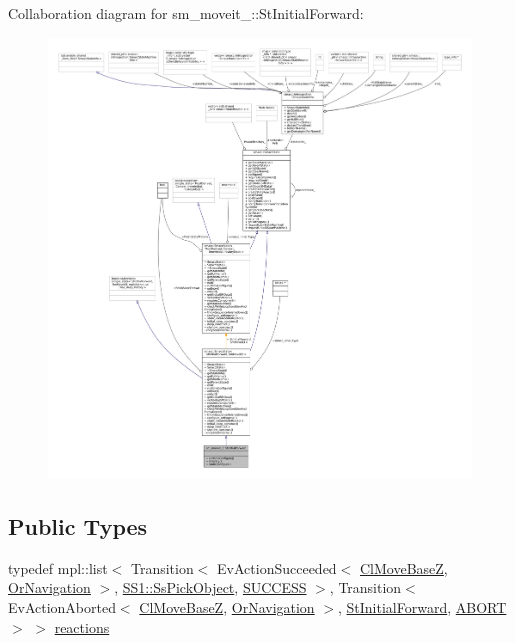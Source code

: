 Collaboration diagram for sm\+\_\+moveit\+\_\+:\+:St\+Initial\+Forward\+:
\nopagebreak
\begin{figure}[H]
\begin{center}
\leavevmode
\includegraphics[width=350pt]{structsm__moveit__3_1_1StInitialForward__coll__graph}
\end{center}
\end{figure}
\subsection*{Public Types}
\begin{DoxyCompactItemize}
\item 
typedef mpl\+::list$<$ Transition$<$ Ev\+Action\+Succeeded$<$ \hyperlink{classcl__move__base__z_1_1ClMoveBaseZ}{Cl\+Move\+BaseZ}, \hyperlink{classsm__moveit__3_1_1OrNavigation}{Or\+Navigation} $>$, \hyperlink{structsm__moveit__3_1_1SS1_1_1SsPickObject}{S\+S1\+::\+Ss\+Pick\+Object}, \hyperlink{classSUCCESS}{S\+U\+C\+C\+E\+SS} $>$, Transition$<$ Ev\+Action\+Aborted$<$ \hyperlink{classcl__move__base__z_1_1ClMoveBaseZ}{Cl\+Move\+BaseZ}, \hyperlink{classsm__moveit__3_1_1OrNavigation}{Or\+Navigation} $>$, \hyperlink{structsm__moveit__3_1_1StInitialForward}{St\+Initial\+Forward}, \hyperlink{classABORT}{A\+B\+O\+RT} $>$ $>$ \hyperlink{structsm__moveit__3_1_1StInitialForward_afb6ed667a9bcc95023882f0e9c903d34}{reactions}
\end{DoxyCompactItemize}
